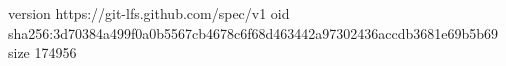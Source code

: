 version https://git-lfs.github.com/spec/v1
oid sha256:3d70384a499f0a0b5567cb4678c6f68d463442a97302436accdb3681e69b5b69
size 174956
